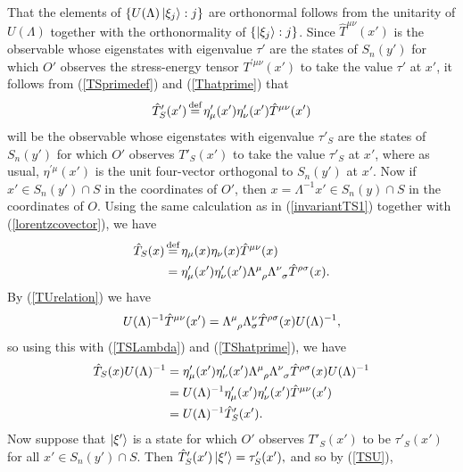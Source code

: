 That the elements of $\{U(\Lambda)\ket{\xi_j}:j\}$ are orthonormal follows from the unitarity of $U(\Lambda)$ together with the orthonormality of  $\{\ket{\xi_j}:j\}$.  Since $\hat{T}^{\mu\nu}(x')$ is the observable whose eigenstates with eigenvalue $\tau'$ are the states of $S_n(y')$ for which $O'$ observes the stress-energy tensor $T^{\prime\mu\nu}(x')$ to take the value $\tau'$ at $x'$, it follows from (\ref{TSprimedef}) and (\ref{Thatprime})  that 
\begin{equation}\label{TShatprime}
	\hat{T}'_S(x')\myeq\eta_\mu'(x')\eta_\nu'(x')\hat{T}^{\mu\nu}(x')
\end{equation}
 will be the observable whose eigenstates with eigenvalue $\tau'_S$ are the states of $S_n(y')$ for which $O'$ observes $T'_S(x')$ to take the value $\tau'_S$ at $x'$, where as usual, $\eta^{\prime\mu}(x')$ is the unit four-vector orthogonal to $S_n(y')$ at $x'$. Now if $x'\in S_n(y')\cap S$ in the coordinates of $O'$, then $x=\Lambda^{-1}x'\in S_n(y)\cap S$ in the coordinates of $O$. Using the same calculation as in (\ref{invariantTS1}) together with (\ref{lorentzcovector}), we have
\begin{equation}\label{TSLambda}
\begin{split}
\hat{T}_S(x)&\myeq\eta_\mu(x)\eta_\nu(x)\hat{T}^{\mu\nu}(x)\\
&=\eta_{\mu}'(x')\eta_{\nu}'(x') \Lambda\indices{^\mu_\rho}\Lambda\indices{^\nu_\sigma}\hat{T}^{\rho\sigma}(x).
\end{split}
\end{equation}
By (\ref{TUrelation}) we have
\begin{equation}
	U(\Lambda)^{-1}\hat{T}^{\mu\nu}(x')=\Lambda\indices{^\mu_\rho}\Lambda{^\nu_\sigma}\hat{T}^{\rho\sigma}(x)U(\Lambda)^{-1},
\end{equation}
so using this with (\ref{TSLambda}) and (\ref{TShatprime}), we have
\begin{equation}\label{TSU}
\begin{split}
\hat{T}_S(x)U(\Lambda)^{-1}&=\eta_{\mu}'(x')\eta_{\nu}'(x')\Lambda\indices{^\mu_\rho}\Lambda\indices{^\nu_\sigma}\hat{T}^{\rho\sigma}(x)U(\Lambda)^{-1}\\
&=U(\Lambda)^{-1} \eta_{\mu}'(x')\eta_{\nu}'(x')\hat{T}^{\mu\nu}(x')\\
&=U(\Lambda)^{-1} \hat{T}_S'(x').
\end{split}
\end{equation}
Now suppose that $\ket{\xi'}$ is a state for which $O'$ observes $T'_S(x')$ to be $\tau'_S(x')$ for all $x'\in S_n(y')\cap S$. Then $\hat{T}_S'(x')\ket{\xi'}=\tau_S'(x'),$ and so by (\ref{TSU}), 
